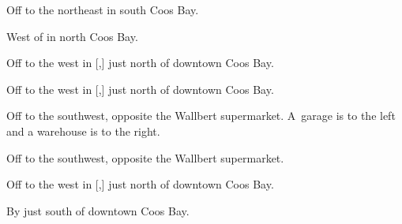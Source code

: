 

\begin{LocationList}

Off  to the northeast in south Coos Bay.

\Location{\GasStation \Gas}
West of  in north Coos Bay.

Off  to the west in [,] just north of downtown Coos Bay.

Off  to the west in [,] just north of downtown Coos Bay.

Off  to the southwest, opposite the Wallbert supermarket.
A~garage is to the left and a warehouse is to the right.

Off  to the southwest, opposite the Wallbert supermarket.

\Location{\TruckService \Rest \Service}
Off  to the west in [,] just north of downtown Coos Bay.

By  just south of downtown Coos Bay.

\end{LocationList}
